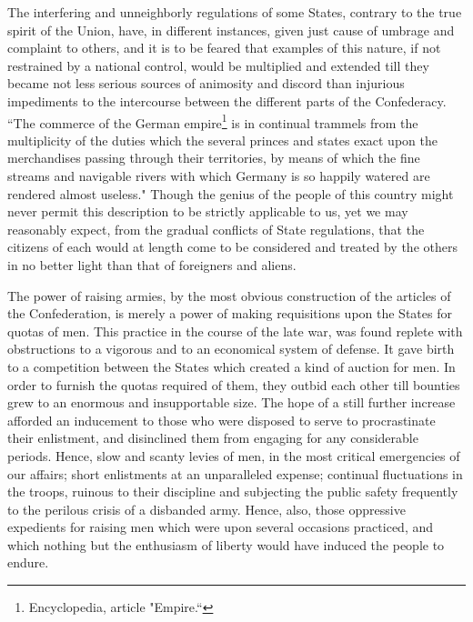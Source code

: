 The interfering and unneighborly regulations of some States, contrary to the true spirit of the Union, have, in different instances, given just cause of umbrage and complaint to others, and it is to be feared that examples of this nature, if not restrained by a national control, would be multiplied and extended till they became not less serious sources of animosity and discord than injurious impediments to the intercourse between the different parts of the Confederacy. ``The commerce of the German empire\footnote{Encyclopedia, article "Empire.``} is in continual trammels from the multiplicity of the duties which the several princes and states exact upon the merchandises passing through their territories, by means of which the fine streams and navigable rivers with which Germany is so happily watered are rendered almost useless." Though the genius of the people of this country might never permit this description to be strictly applicable to us, yet we may reasonably expect, from the gradual conflicts of State regulations, that the citizens of each would at length come to be considered and treated by the others in no better light than that of foreigners and aliens.

The power of raising armies, by the most obvious construction of the articles of the Confederation, is merely a power of making requisitions upon the States for quotas of men. This practice in the course of the late war, was found replete with obstructions to a vigorous and to an economical system of defense. It gave birth to a competition between the States which created a kind of auction for men. In order to furnish the quotas required of them, they outbid each other till bounties grew to an enormous and insupportable size. The hope of a still further increase afforded an inducement to those who were disposed to serve to procrastinate their enlistment, and disinclined them from engaging for any considerable periods. Hence, slow and scanty levies of men, in the most critical emergencies of our affairs; short enlistments at an unparalleled expense; continual fluctuations in the troops, ruinous to their discipline and subjecting the public safety frequently to the perilous crisis of a disbanded army. Hence, also, those oppressive expedients for raising men which were upon several occasions practiced, and which nothing but the enthusiasm of liberty would have induced the people to endure.

